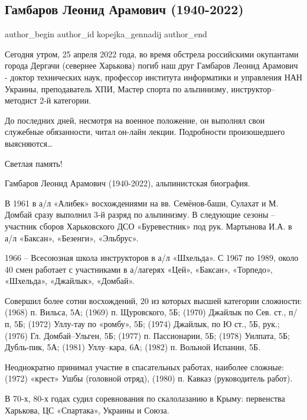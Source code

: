  
 
 
 
 
 
\subsection{Гамбаров Леонид Арамович (1940-2022)}
\label{sec:25_04_2022.fb.kopejka_gennadij.1.gambarov}
 
\ifcmt
 author_begin
   author_id kopejka_gennadij
 author_end
\fi

Сегодня утром, 25 апреля 2022 года, во время обстрела российскими окупантами
города Дергачи (севернее Харькова) погиб наш друг Гамбаров Леонид Арамович -
доктор технических наук, профессор института информатики и управления НАН
Украины, преподаватель ХПИ, Мастер спорта по альпинизму, инструктор–методист
2-й категории.


До последних дней, несмотря на военное положение, он выполнял свои служебные
обязанности, читал он-лайн лекции. Подробности произошедшего выясняются…

Светлая память!

Гамбаров Леонид Арамович (1940-2022), альпинистская биография.

В 1961 в а/л «Алибек» восхождениями на вв. Семёнов-баши, Сулахат и М. Домбай
сразу выполнил 3-й разряд по альпинизму. В следующие сезоны – участник сборов
Харьковского ДСО «Буревестник» под рук. Мартынова И.А. в а/л «Баксан»,
«Безенги», «Эльбрус».

1966 – Всесоюзная школа инструкторов в а/л «Шхельда». С 1967 по 1989, около 40
смен работает с участниками в а/лагерях «Цей», «Баксан», «Торпедо», «Шхельда»,
«Джайлык», «Домбай». 

Совершил более сотни восхождений, 20 из которых высшей категории сложности:
(1968) п. Вильса, 5А; (1969) п. Щуровского, 5Б; (1970) Джайлык по Сев. ст.,
п/п, 5Б; (1972) Уллу-тау по «ромбу», 5Б; (1974) Джайлык, по Ю ст., 5Б, рук.;
(1976) Гл. Домбай–Ульген, 5Б; (1977) п. Пассионарии, 5Б; (1978) Уилпата, 5Б;
Дубль-пик, 5А; (1981) Уллу–кара, 6А; (1982) п. Вольной Испании, 5Б.

Неоднократно принимал участие в спасательных работах, наиболее сложные: (1972)
«крест» Ушбы (головной отряд), (1980) п. Кавказ (руководитель работ).

В 70-х, 80-х годах судил соревнования по скалолазанию в Крыму: первенства
Харькова, ЦС «Спартака», Украины и Союза.

